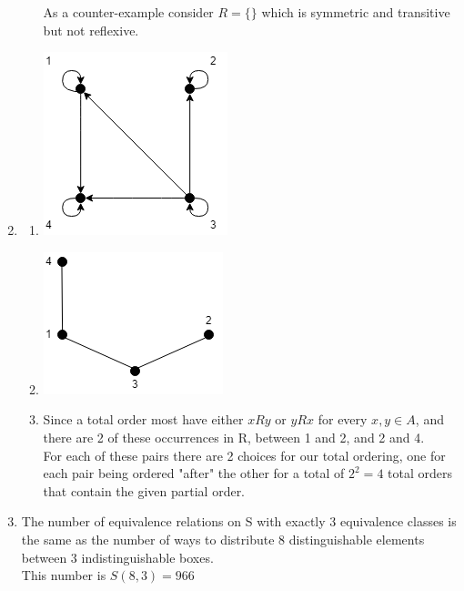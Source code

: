 \documentclass[11pt]{article}
\begin{document}
\begin{enumerate}[]
\begin{enumerate}[label=\alph*]
	As a counter-example consider $R=\{\}$ which is symmetric and transitive but not reflexive.
	\end{enumerate}
\item
	\begin{enumerate}[label=\alph*]
	\item \mbox{}
	\begin{center}
		\includegraphics[scale=0.5]{7a-digraph.png}\\
	\end{center}
	\item \mbox{}
	\begin{center}
		\includegraphics[scale=0.5]{7b-hasse-diagram.png}\\
	\end{center}
	\item Since a total order most have either $xRy$ or $yRx$ for every $x,y\in A$, and there are 2 of these occurrences in R, between 1 and 2, and 2 and 4.\\
	For each of these pairs there are 2 choices for our total ordering, one for each pair being ordered "after" the other for a total of $2^2=4$ total orders that contain the given partial order.
	\end{enumerate}
\item The number of equivalence relations on S with exactly 3 equivalence classes is the same as the number of ways to distribute 8 distinguishable elements between 3 indistinguishable boxes.\\
This number is $S(8,3)=966$
\end{enumerate}
\end{document}
